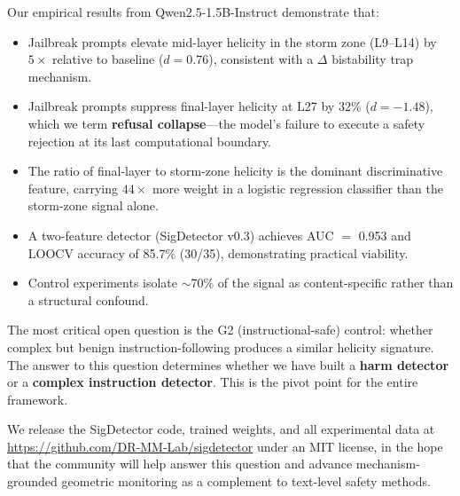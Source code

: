 \documentclass[12pt,a4paper]{article}
\begin{document}
Our empirical results from Qwen2.5-1.5B-Instruct demonstrate that:

\begin{itemize}[leftmargin=*]
    \item Jailbreak prompts elevate mid-layer helicity in the storm zone (L9--L14) by $5\times$ relative to baseline ($d = 0.76$), consistent with a $\Delta$ bistability trap mechanism.
    \item Jailbreak prompts suppress final-layer helicity at L27 by 32\% ($d = -1.48$), which we term \textbf{refusal collapse}---the model's failure to execute a safety rejection at its last computational boundary.
    \item The ratio of final-layer to storm-zone helicity is the dominant discriminative feature, carrying $44\times$ more weight in a logistic regression classifier than the storm-zone signal alone.
    \item A two-feature detector (SigDetector v0.3) achieves AUC $=$ 0.953 and LOOCV accuracy of 85.7\% (30/35), demonstrating practical viability.
    \item Control experiments isolate $\sim$70\% of the signal as content-specific rather than a structural confound.
\end{itemize}

The most critical open question is the G2 (instructional-safe) control: whether complex but benign instruction-following produces a similar helicity signature. The answer to this question determines whether we have built a \textbf{harm detector} or a \textbf{complex instruction detector}. This is the pivot point for the entire framework.

We release the SigDetector code, trained weights, and all experimental data at \url{https://github.com/DR-MM-Lab/sigdetector} under an MIT license, in the hope that the community will help answer this question and advance mechanism-grounded geometric monitoring as a complement to text-level safety methods.
\end{document}
